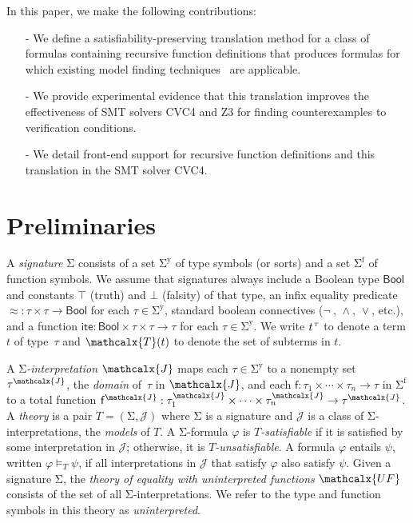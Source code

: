 \documentclass[runningheads,a4paper]{llncs}
\newcommand{\con}[1]{\mathsf{#1}}
\let\oldSigma=\Sigma
\def\Sigma{\mathrm{\oldSigma}}
\let\oldneg=\neg
\def\neg{\oldneg\:}
\let\oldvee=\vee
\def\vee{\mathrel{\oldvee}}
\let\oldwedge=\wedge
\def\wedge{\mathrel{\oldwedge}}
\newcommand\cvc{CVC4\xspace}
\newcommand\ziii{Z3\xspace}
\newcommand{\teq}{\approx}
\newcommand{\terms}{\mathcalx{T}}
\newcommand{\I}{\mathcalx{J}} %
\newcommand{\ssorts}[1]{#1^\mathrm{y}}
\newcommand{\sfuns}[1]{#1^\mathrm{f}}
\newcommand{\sfundefs}[1]{#1^\mathrm{def}}
\newcommand\ty[1]{\con{#1}}
\newcommand{\Bool}{\ty{Bool}}
\newcommand{\ltrue}{\top}
\newcommand{\lfalse}{\bot}
\newcommand{\lite}{\con{ite}}
\newcommand{\vthinspace}{\kern+0.083333em}
\newcommand{\typ}[1]{^{\vthinspace #1}}
\newcommand{\Mo}{{\mathcal{\!J\!}}}
\newcommand{\euf}{\ensuremath{\mathcalx{UF}}\xspace}
\begin{document}
In this paper, we make the following contributions:
\begin{itemize}
\item[-] We define a satisfiability-preserving translation method for a class of formulas containing recursive function definitions
that produces formulas for which existing model finding techniques~\cite{GeDeM-CAV-09, ReyEtAl-1-RR-13} are applicable.
\item[-] We provide experimental evidence that this translation improves the effectiveness of SMT solvers \cvc and \ziii for finding counterexamples to verification conditions.
\item[-] We detail front-end support for recursive function definitions and this translation in the SMT solver \cvc.
\end{itemize}

\section{Preliminaries}
\label{sec:prelim}

A \emph{signature} $\Sigma$ consists of
a set $\ssorts{\Sigma}$ of type symbols (or sorts) and
a set $\sfuns{\Sigma}$ of function symbols.
We assume that signatures always include a Boolean type $\Bool$ and constants
$\ltrue$ (truth) and $\lfalse$ (falsity) of that type,
an infix equality predicate ${\teq} : \tau \times \tau \to \Bool$
for each $\tau \in \ssorts{\Sigma}$,
standard boolean connectives ($\neg$, $\wedge$, $\vee$, etc.),
and a function $\lite : \Bool \times \tau \times \tau \rightarrow \tau$ for each $\tau \in \ssorts{\Sigma}$.
We write $t\typ{\tau}$ to denote a term $t$ of type~$\tau$ and
$\terms( t )$ to denote the set of subterms in $t$.

A \emph{$\Sigma$-interpretation $\I$} %
maps each $\tau \in \ssorts{\Sigma}$ to a nonempty set $\tau^\I$,
the \emph{domain} of~$\tau$ in $\I$,
and each $\con{f} : \tau_1 \times \cdots \times \tau_n \rightarrow \tau$ in
$\sfuns{\Sigma}$
to a total function $\con{f}^\I : \tau_1^\I \times \cdots \times \tau_n^\I \rightarrow \tau^\I$.
A \emph{theory} is a pair $T = (\Sigma, \Mo)$ where
$\Sigma$ is a signature and  $\Mo$ is a class of $\Sigma$-interpretations,
the \emph{models} of $T$.
A $\Sigma$-formula $\varphi$ is
\emph{$T$-satisfiable}
if it is satisfied by some interpretation in $\Mo$;
otherwise, it is \emph{$T$-unsatisfiable}.
A formula $\varphi$ entails $\psi$, written $\varphi \models_T \psi$,
if all interpretations in $\Mo$ that satisfy $\varphi$ also satisfy $\psi$.
Given a signature $\Sigma$,
the \emph{theory of equality with uninterpreted functions} \euf
consists of the set of all $\Sigma$-interpretations.
We refer to the type and function symbols in this theory as \emph{uninterpreted}.
\end{document}
